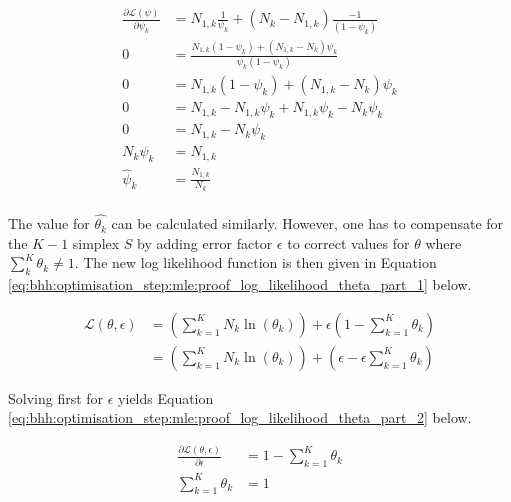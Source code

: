 \begin{equation}
      \label{eq:bhh:optimisation_step:mle:proof_log_likelihood_psi}
      \begin{split}
            \frac{\partial \mathcal{L}(\psi)}{\partial \psi_{k}} &= N_{1,k} \frac{1}{ \psi_{k}} + \left( N_{k} - N_{1,k} \right) \frac{-1}{ \left( 1 - \psi_{k} \right) } \\
            0 &=  \frac{ N_{1,k} \left( 1 - \psi_{k} \right) +  \left( N_{1,k} - N_{k} \right) \psi_{k}}{ \psi_{k} \left( 1 - \psi_{k} \right) } \\
            0 &=  N_{1,k} \left( 1 - \psi_{k} \right) +  \left( N_{1,k} - N_{k} \right) \psi_{k} \\
            0 &=  N_{1,k} - N_{1,k} \psi_{k}  +  N_{1,k} \psi_{k} - N_{k}\psi_{k} \\
            0 &=  N_{1,k} - N_{k}\psi_{k} \\
            N_{k}\psi_{k} &=  N_{1,k} \\
            \hat{\psi}_{k} &=  \frac{N_{1,k}}{N_{k}} \\
      \end{split}
\end{equation}


The value for $\hat{\theta_{k}} $ can be calculated similarly. However, one has to compensate for the $K-1$ simplex $S$ by adding error factor $\epsilon$ to correct values for  $\theta$ where $\sum_{k}^{K} \theta_{k} \neq 1$. The new log likelihood function is then given in Equation \ref{eq:bhh:optimisation_step:mle:proof_log_likelihood_theta_part_1} below.

\begin{equation}
      \label{eq:bhh:optimisation_step:mle:proof_log_likelihood_theta_part_1}
      \begin{split}
            \mathcal{L}(\theta, \epsilon)
            &=  \left( \sum_{k=1}^{K} N_{k} \ln \left( \theta_{k} \right) \right) + \epsilon \left( 1 - \sum_{k=1}^{K} \theta_{k} \right) \\
            &=  \left( \sum_{k=1}^{K} N_{k} \ln \left( \theta_{k} \right) \right) + \left( \epsilon -  \epsilon \sum_{k=1}^{K} \theta_{k} \right)
      \end{split}
\end{equation}

Solving first for $\epsilon$ yields Equation \ref{eq:bhh:optimisation_step:mle:proof_log_likelihood_theta_part_2} below.

\begin{equation}
      \label{eq:bhh:optimisation_step:mle:proof_log_likelihood_theta_part_2}
      \begin{split}
            \frac{\partial \mathcal{L}(\theta, \epsilon)}{\partial \epsilon} &= 1 - \sum_{k=1}^{K} \theta_{k}  \\
            \sum_{k=1}^{K} \theta_{k}  &= 1
      \end{split}
\end{equation}

